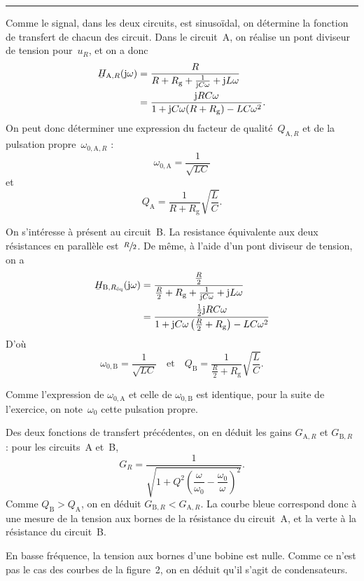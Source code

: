 \documentclass[a4paper]{article}
\begin{document}
	\begin{multicols}{2}
		\quad\hrule

		Comme le signal, dans les deux circuits, est sinusoïdal, on détermine la fonction de transfert de chacun des circuit.
		Dans le circuit~A, on réalise un pont diviseur de tension pour~$u_R$, et on a donc
		\begin{align*}
			\ubar{H}_{\text{A},R}(\mathrm{j}\omega) &= \frac{R}{R + R_\text{g} + \frac{1}{\mathrm{j}C\omega} + \mathrm{j}L\omega}\\
			&= \frac{\mathrm{j}RC\omega}{1 + \mathrm{j}C\omega(R + R_\text{g}) - LC\omega^2}.
		\end{align*}
		On peut donc déterminer une expression du facteur de qualité~$Q_{\text{A},R}$\/ et de la pulsation propre~$\omega_{0,\text{A},R}$\/ : \[
			\omega_{0,\text{A}} = \frac{1}{\sqrt{LC}}
		\] et \[
			Q_{\text{A}} = \frac{1}{R + R_\text{g}} \sqrt{\frac{L}{C}}
		.\]

		On s'intéresse à présent au circuit~B.
		La resistance équivalente aux deux résistances en parallèle est~$\sfrac{R}{2}$.
		De même, à l'aide d'un pont diviseur de tension, on a
		\begin{align*}
			\ubar{H}_{\text{B},R_\text{éq}}(\mathrm{j}\omega) &= \frac{\frac{R}{2}}{\frac{R}{2} + R_\text{g} + \frac{1}{\mathrm{j}C\omega} + \mathrm{j}L\omega}\\
			&= \frac{\frac{1}{2}\mathrm{j}RC\omega}{1 + \mathrm{j}C\omega\left( \frac{R}{2} + R_\text{g} \right) - LC\omega^2} \\
		\end{align*}
		D'où \[
			\omega_{0,\text{B}} = \frac{1}{\sqrt{LC}}\quad\text{et}\quad
			Q_{\text{B}} = \frac{1}{\frac{R}{2}+R_\text{g}} \sqrt{\frac{L}{C}}
		.\]

		Comme l'expression de $\omega_{0,\text{A}}$\/ et celle de $\omega_{0,\text{B}}$\/ est identique, pour la suite de l'exercice, on note~$\omega_0$\/ cette pulsation propre.

		Des deux fonctions de transfert précédentes, on en déduit les gains $G_{\text{A},R}$\/ et $G_{\text{B},R}$\/ : pour les circuits~A et~B,\[
			G_{R} = \frac{1}{\sqrt{1 + Q^2\left( \dfrac{\omega}{\omega_0} - \dfrac{\omega_0}{\omega} \right)^2}}
		.\] Comme $Q_\text{B} > Q_\text{A}$, on en déduit $G_{\text{B},R} < G_{\text{A},R}$. La courbe bleue correspond donc à une mesure de la tension aux bornes de la résistance du circuit~A, et la verte à la résistance du circuit~B.
		\bigskip

		En basse fréquence, la tension aux bornes d'une bobine est nulle. Comme ce n'est pas le cas des courbes de la figure~2, on en déduit qu'il s'agit de condensateurs.


\end{multicols}
\end{document}
